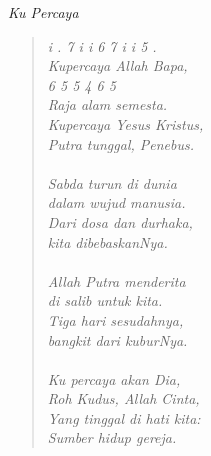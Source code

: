 \small
\begin{center}
\itshape{Ku Percaya}
\end{center}


\begin{verse}
\itshape{
i . 7 i i 6 7 i i 5 . \\
Kupercaya Allah Bapa, \\
6 5 5 4 6 5\\
Raja alam semesta.\\
Kupercaya Yesus Kristus, \\
Putra tunggal, Penebus.\\
{~}\\
Sabda turun di dunia \\
dalam wujud manusia.\\
Dari dosa dan durhaka,\\
 kita dibebaskanNya.\\
{~}\\
Allah Putra menderita\\
di salib untuk kita.\\
Tiga hari sesudahnya, \\
bangkit dari kuburNya.\\
{~}\\
Ku percaya akan Dia, \\
Roh Kudus, Allah Cinta,\\
Yang tinggal di hati kita:\\
Sumber hidup gereja.
}
\end{verse}
\normalsize
